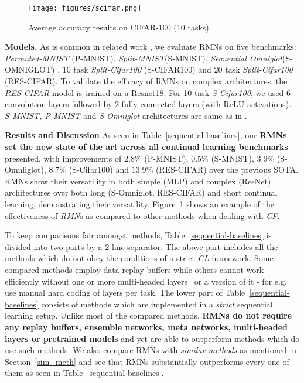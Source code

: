 \documentclass{article}
\begin{document}
\begin{figure}
\begin{center}
\centerline{\texttt{[image: figures/scifar.png]}}
\vspace{-\baselineskip}
\caption{Average accuracy results on CIFAR-100 (10 tasks)}
\label{scifar}
\end{center}
\vspace*{-2.8\baselineskip}
\end{figure}

\textbf{Models.} As is common in related work \cite{titsias2019functional, kirkpatrick2017overcoming, nguyen2017variational, pan2021continual, jung2020continual}, we evaluate RMNs on five benchmarks: \textit{Permuted-MNIST} \cite{kirkpatrick2017overcoming}(P-MNIST), \textit{Split-MNIST}(S-MNIST), \textit{Sequential Omniglot}(S-OMNIGLOT) \cite{schwarz2018progress}, 10 task \textit{Split-Cifar100} \cite{zenke2017continual}(S-CIFAR100) and 20 task \textit{Split-Cifar100} (RES-CIFAR). To validate the efficacy of RMNs on complex architectures, the \textit{RES-CIFAR} model is trained on a Resnet18. For 10 task \textit{S-Cifar100}, we used 6 convolution layers followed by 2 fully connected layers (with ReLU activations). \textit{S-MNIST, P-MNIST} and \textit{S-Omniglot} architectures are same as in \cite{titsias2019functional}.

\textbf{Results and Discussion}
As seen in Table~\ref{sequential-baselines}, our \textbf{RMNs set the new state of the art across all continual learning benchmarks} presented, with improvements of $2.8\%$ (P-MNIST), $0.5\%$ (S-MNIST), $3.9\%$ (S-Omnliglot), $8.7\%$ (S-Cifar100) and $13.9\%$ (RES-CIFAR) over the previous SOTA. RMNs show their versatility in both simple (MLP) and complex (ResNet) architectures over both long (S-Omniglot, RES-CIFAR) and short continual learning, demonstrating their versatility. Figure~\ref{scifar} shows an example of the effectiveness of \textit{RMN}s as compared to other methods when dealing with \textit{CF}.

To keep comparisons fair amongst methods, Table~\ref{sequential-baselines} is divided into two parts by a 2-line separator. The above part includes all the methods which do not obey the conditions of a strict \textit{CL} framework.
Some compared methods\cite{nguyen2017variational, titsias2019functional, Chaudhry_2018_ECCV, guo2020improved, pan2021continual} employ data replay buffers while others cannot work efficiently without one or more multi-headed layers~\cite{nguyen2017variational, Chaudhry_2018_ECCV, jung2020continual} or a version of it - for e.g. \cite{Serr2018OvercomingCF} use manual hard coding of layers per task. The lower part of Table~\ref{sequential-baselines} consists of methods which are implemented in a \textit{strict} sequential learning setup.
Unlike most of the compared methods, \textbf{RMNs do not require any replay buffers, ensemble networks, meta networks, multi-headed layers or pretrained models} and yet are able to outperform methods which do use such methods.
We also compare RMNs with \textit{similar methods} as mentioned in Section~\ref{sim_meth} and see that RMNs substantially outperforms every one of them as seen in Table~\ref{sequential-baselines}.
\end{document}
